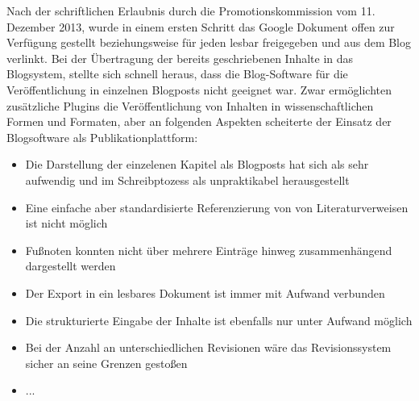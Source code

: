 Nach der schriftlichen Erlaubnis durch die Promotionskommission vom 11. Dezember 2013, wurde in einem ersten Schritt das Google Dokument offen zur Verfügung gestellt beziehungsweise für jeden lesbar freigegeben und aus dem Blog verlinkt. Bei der Übertragung der bereits geschriebenen Inhalte in das Blogsystem, stellte sich schnell heraus, dass die Blog-Software für die Veröffentlichung in einzelnen Blogposts nicht geeignet war. Zwar ermöglichten zusätzliche Plugins die Veröffentlichung von Inhalten in wissenschaftlichen Formen und Formaten, aber an folgenden Aspekten scheiterte der Einsatz der Blogsoftware als Publikationplattform:
\begin{itemize}
\item Die Darstellung der einzelenen Kapitel als Blogposts hat sich als sehr aufwendig und im Schreibptozess als unpraktikabel herausgestellt
\item Eine einfache aber standardisierte Referenzierung von von Literaturverweisen ist nicht möglich
\item Fußnoten konnten nicht über mehrere Einträge hinweg zusammenhängend dargestellt werden
\item Der Export in ein lesbares Dokument ist immer mit Aufwand verbunden
\item Die strukturierte Eingabe der Inhalte ist ebenfalls nur unter Aufwand möglich
\item Bei der Anzahl an unterschiedlichen Revisionen wäre das Revisionssystem sicher an seine Grenzen gestoßen
\item ...
\end{itemize}

